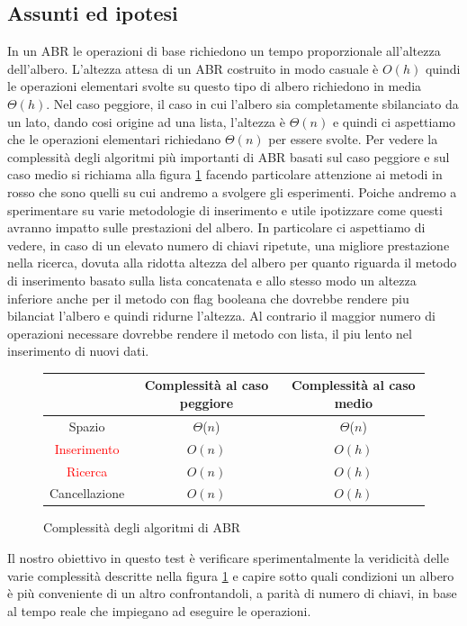 \subsection{Assunti ed ipotesi}
\label{sec:AssuntiEdIpotesi_1}
In un ABR le operazioni di base richiedono un tempo proporzionale all'altezza dell'albero. L'altezza attesa di un ABR costruito in modo casuale è $O(h)$ quindi
le operazioni elementari svolte su questo tipo di albero richiedono in media $\Theta(h)$. Nel caso peggiore, il caso in cui l'albero sia completamente sbilanciato 
da un lato, dando cosi origine ad una lista, l'altezza è $\Theta(n)$ e quindi ci aspettiamo che le operazioni elementari richiedano $\Theta(n)$ per essere svolte.
Per vedere la complessità degli algoritmi più importanti di ABR basati sul caso peggiore e sul caso medio si richiama alla figura \ref{fig:ComplessitàABR} facendo
particolare attenzione ai metodi in rosso che sono quelli su cui andremo a svolgere gli esperimenti.
Poiche andremo a sperimentare su varie metodologie di inserimento e utile ipotizzare come questi avranno impatto sulle prestazioni del albero. In particolare
ci aspettiamo di vedere, in caso di un elevato numero di chiavi ripetute, una migliore prestazione nella ricerca, dovuta alla ridotta altezza del albero per quanto riguarda il metodo
di inserimento basato sulla lista concatenata e allo stesso modo un altezza inferiore anche per il metodo con flag booleana che dovrebbe rendere piu bilanciat l'albero 
e quindi ridurne l'altezza. 
Al contrario il maggior numero di operazioni necessare dovrebbe rendere il metodo con lista, il piu lento nel inserimento di nuovi dati.

\begin{figure}[H]
    \centering
    \begin{tabular}{|c|c|c|}
        \hline
         & Complessità al caso peggiore & Complessità al caso medio\\
        \hline
        Spazio & $\Theta$($n$) & $\Theta$($n$)\\
        \hline
        \textcolor{red}{Inserimento} & $O(n)$ & $O(h)$\\
        \hline
        \textcolor{red}{Ricerca} & $O(n)$ & $O(h)$\\
        \hline
        Cancellazione & $O(n)$ & $O(h)$\\
        \hline
    \end{tabular}
    \caption{Complessità degli algoritmi di ABR}
    \label{fig:ComplessitàABR}
\end{figure}
Il nostro obiettivo in questo test è verificare sperimentalmente la veridicità delle varie complessità descritte nella figura \ref{fig:ComplessitàABR} e capire
sotto quali condizioni un albero è più conveniente di un altro confrontandoli, a parità di numero di chiavi, in base al tempo reale che impiegano ad eseguire le operazioni.

